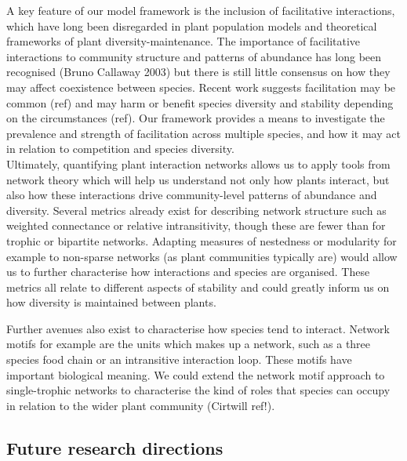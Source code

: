 \documentclass[a4,12pt]{article}
\begin{document}
        A key feature of our model framework is the inclusion of facilitative interactions, which have long been disregarded in plant population models and theoretical frameworks of plant diversity-maintenance. The importance of facilitative interactions to community structure and patterns of abundance has long been recognised (Bruno Callaway 2003) but there is still little consensus on how they may affect coexistence between species. %
        Recent work suggests facilitation may be common (ref) and may harm or benefit species diversity and stability depending on the circumstances (ref). Our framework provides a means to investigate the prevalence and strength of facilitation across multiple species, and how it may act in relation to competition and species diversity.  \\
     
        Ultimately, quantifying plant interaction networks allows us to apply tools from network theory which will help us understand not only how plants interact, but also how these interactions drive community-level patterns of abundance and diversity. Several metrics already exist for describing network structure such as weighted connectance or relative intransitivity, though these are fewer than for trophic or bipartite networks. Adapting measures of nestedness or modularity for example to non-sparse networks (as plant communities typically are) would allow us to further characterise how interactions and species are organised. These metrics all relate to different aspects of stability and could greatly inform us on how diversity is maintained between plants.  

        Further avenues also exist to characterise how species tend to interact. Network motifs for example are the units which makes up a network, such as a three species food chain or an intransitive interaction loop. These motifs have important biological meaning. We could extend the network motif approach to single-trophic networks to characterise the kind of roles that species can occupy in relation to the wider plant community (Cirtwill ref!). \\



    \subsection{Future research directions}
\end{document}
